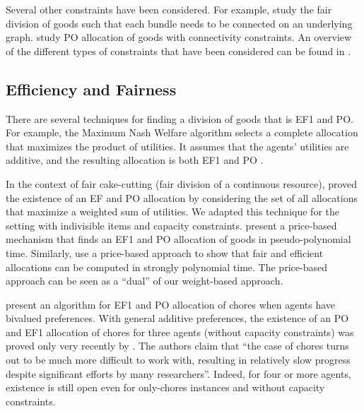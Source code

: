 \documentclass[sigconf]{aamas}
\theoremstyle{definition}
\begin{document}
Several other constraints have been considered. For example, 
\citet{bilo2022almost} study the fair division of goods such that each bundle needs to be connected on an underlying graph. \citet{igarashi2019} study PO allocation of goods with connectivity constraints.
An overview of the different types of constraints that have been considered can be found in \cite{suksompong2021constraints}.

\subsection{Efficiency and Fairness}
There are several techniques for finding a division of goods that is EF1 and PO. For example, the Maximum Nash Welfare algorithm selects a complete allocation that maximizes the product of utilities. It assumes that the agents' utilities are additive, and the resulting allocation is both EF1 and PO \cite{caragiannis2016,Wu2020}.

In the context of fair cake-cutting (fair division of a continuous resource), 
\citet{WELLER19855} proved the existence of an EF and PO allocation by considering the set of all allocations that maximize a weighted sum of utilities. We adapted this technique for the setting with indivisible items and capacity constraints.
\citet{barman2018finding} present a price-based mechanism that finds an EF1 and PO allocation of goods in pseudo-polynomial time.
Similarly, \citet{barman2019proximity} use a price-based approach to show that fair and efficient allocations can be computed in strongly polynomial time.
The price-based approach can be seen as a ``dual'' of our weight-based approach.


\citet{garg2022fair} present an algorithm for EF1 and PO allocation of chores when agents have bivalued preferences.
With general additive preferences,
the existence of an PO and EF1 allocation of chores for three agents (without capacity constraints) was proved only very recently by \citet{garg2022improving}. The authors claim that ``the case of chores turns out to be much more difficult to work with, resulting in relatively slow progress despite significant efforts by many researchers''. Indeed, for four or more agents, existence is still open even for only-chores instances and without capacity constraints.
\end{document}
